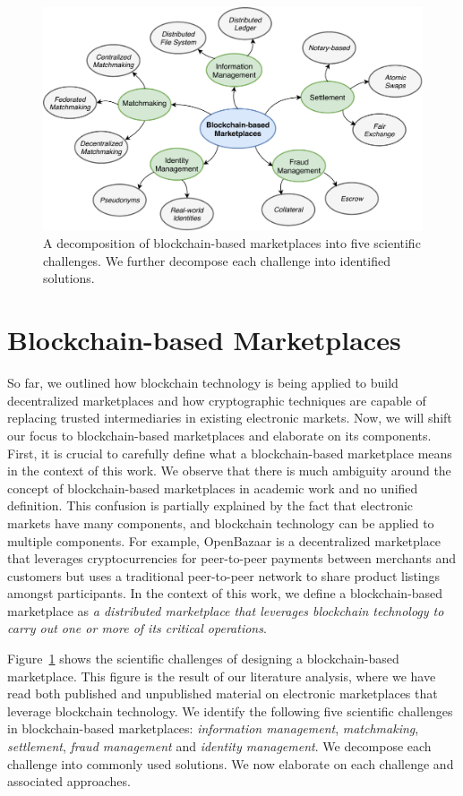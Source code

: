 \begin{figure}[t]
	\centering
	\includegraphics[width=\linewidth]{introduction/assets/decomposition}
	\caption{A decomposition of blockchain-based marketplaces into five scientific challenges. We further decompose each challenge into identified solutions.}
	\label{fig:electronic_markets}
\end{figure}

\section{Blockchain-based Marketplaces}
So far, we outlined how blockchain technology is being applied to build decentralized marketplaces and how cryptographic techniques are capable of replacing trusted intermediaries in existing electronic markets.
Now, we will shift our focus to blockchain-based marketplaces and elaborate on its components.
First, it is crucial to carefully define what a blockchain-based marketplace means in the context of this work.
We observe that there is much ambiguity around the concept of blockchain-based marketplaces in academic work and no unified definition.
This confusion is partially explained by the fact that electronic markets have many components, and blockchain technology can be applied to multiple components.
For example, OpenBazaar is a decentralized marketplace that leverages cryptocurrencies for peer-to-peer payments between merchants and customers but uses a traditional peer-to-peer network to share product listings amongst participants.
In the context of this work, we define a blockchain-based marketplace as \emph{a distributed marketplace that leverages blockchain technology to carry out one or more of its critical operations}.

Figure~\ref{fig:electronic_markets} shows the scientific challenges of designing a blockchain-based marketplace.
This figure is the result of our literature analysis, where we have read both published and unpublished material on electronic marketplaces that leverage blockchain technology.
We identify the following five scientific challenges in blockchain-based marketplaces: \emph{information management}, \emph{matchmaking}, \emph{settlement}, \emph{fraud management} and \emph{identity management}.
We decompose each challenge into commonly used solutions.
We now elaborate on each challenge and associated approaches.


